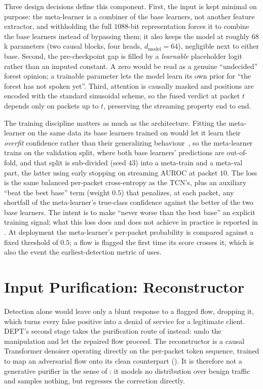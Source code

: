 Three design decisions define this component. First, the input is kept minimal on
purpose: the meta-learner is a combiner of the base learners, not another feature
extractor, and
withholding the full $1088$-bit representation forces it to combine the base learners
instead of bypassing them; it also keeps the model at roughly $68$k parameters (two
causal blocks, four heads, $d_{\text{model}}=64$), negligible next to either base.
Second, the pre-checkpoint gap is filled by a \emph{learnable} placeholder logit rather
than an imputed constant. A zero would be read as a genuine ``undecided'' forest
opinion; a trainable parameter lets the model learn its own prior for ``the forest has
not spoken yet''. Third, attention is causally masked and positions are encoded with
the standard sinusoidal scheme, so the fused verdict at packet $t$ depends only on
packets up to $t$, preserving the streaming property end to end.

The training discipline matters as much as the architecture. Fitting the meta-learner on
the same data its base learners trained on would let it learn their \emph{overfit}
confidence rather than their generalizing behaviour~\cite{wolpert1992stacked}, so the
meta-learner trains on the validation split, where both base learners' predictions are
out-of-fold, and that split is sub-divided (seed $43$) into a meta-train and a meta-val
part, the latter using early stopping on streaming \ac{AUROC} at packet $10$. The
loss is the same balanced per-packet cross-entropy as the \ac{TCN}'s, plus an auxiliary
``beat the best base'' term (weight $0.5$) that penalizes, at each packet, any
shortfall of the meta-learner's true-class confidence against the better of the two
base learners. The intent is to make ``never worse than the best base'' an explicit
training signal; what this loss does and does not achieve in practice is reported in
. At deployment the meta-learner's per-packet
probability is compared against a fixed threshold of $0.5$; a flow is flagged the first
time its score crosses it, which is also the event the earliest-detection metric of
 uses.

\section{Input Purification: Reconstructor}\label{sec:sol-reconstructor}
Detection alone would leave only a blunt response to a flagged flow, dropping it, which
turns every false positive into a denial of service for a legitimate client. DEPT's
second stage takes the purification route of 
instead: undo the manipulation and let the repaired flow proceed. The reconstructor is a
causal Transformer denoiser operating directly on the per-packet token sequence, trained
to map an adversarial flow onto its clean counterpart (). It is
therefore not a generative purifier in the sense of :
it models no distribution over benign traffic and samples nothing, but regresses the
correction directly.

